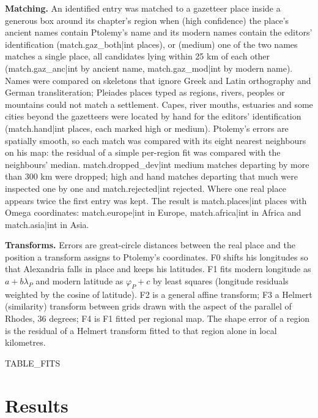 \documentclass[11pt,a4paper]{article}
\begin{document}
\textbf{Matching.} An identified entry was matched to a gazetteer place inside a generous box around its chapter's region when (high confidence) the place's ancient names contain Ptolemy's name and its modern names contain the editors' identification ({{match.gaz_both|int}} places), or (medium) one of the two names matches a single place, all candidates lying within 25 km of each other ({{match.gaz_anc|int}} by ancient name, {{match.gaz_mod|int}} by modern name). Names were compared on skeletons that ignore Greek and Latin orthography and German transliteration; Pleiades places typed as regions, rivers, peoples or mountains could not match a settlement. Capes, river mouths, estuaries and some cities beyond the gazetteers were located by hand for the editors' identification ({{match.hand|int}} places, each marked high or medium). Ptolemy's errors are spatially smooth, so each match was compared with its eight nearest neighbours on his map: the residual of a simple per-region fit was compared with the neighbours' median. {{match.dropped_dev|int}} medium matches departing by more than 300 km were dropped; high and hand matches departing that much were inspected one by one and {{match.rejected|int}} rejected. Where one real place appears twice the first entry was kept. The result is {{match.places|int}} places with Omega coordinates: {{match.europe|int}} in Europe, {{match.africa|int}} in Africa and {{match.asia|int}} in Asia.

\textbf{Transforms.} Errors are great-circle distances between the real place and the position a transform assigns to Ptolemy's coordinates. F0 shifts his longitudes so that Alexandria falls in place and keeps his latitudes. F1 fits modern longitude as $a + b\lambda_P$ and modern latitude as $\varphi_P + c$ by least squares (longitude residuals weighted by the cosine of latitude). F2 is a general affine transform; F3 a Helmert (similarity) transform between grids drawn with the aspect of the parallel of Rhodes, 36 degrees; F4 is F1 fitted per regional map. The shape error of a region is the residual of a Helmert transform fitted to that region alone in local kilometres.

{{TABLE_FITS}}

\section{Results}
\end{document}
